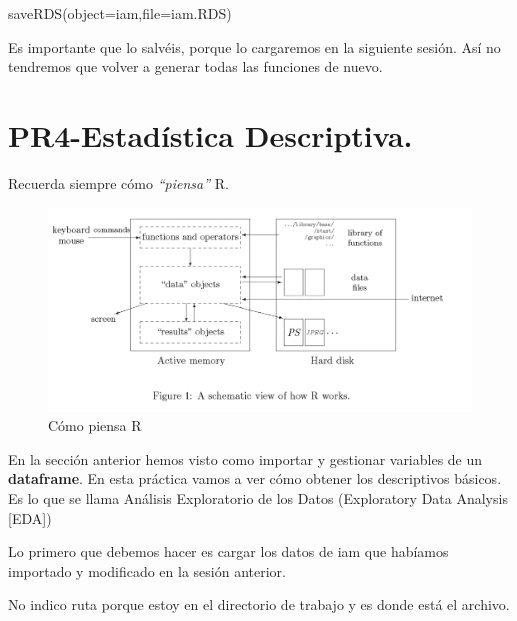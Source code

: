 \documentclass[
  letterpaper,
  DIV=11,
  numbers=noendperiod]{scrreprt}
\newenvironment{Shaded}{\begin{snugshade}}{\end{snugshade}}
\newcommand{\AttributeTok}[1]{\textcolor[rgb]{0.40,0.45,0.13}{#1}}
\newcommand{\FunctionTok}[1]{\textcolor[rgb]{0.28,0.35,0.67}{#1}}
\newcommand{\NormalTok}[1]{\textcolor[rgb]{0.00,0.23,0.31}{#1}}
\newcommand{\StringTok}[1]{\textcolor[rgb]{0.13,0.47,0.30}{#1}}
\begin{document}
\begin{Shaded}
\begin{Highlighting}[]
\FunctionTok{saveRDS}\NormalTok{(}\AttributeTok{object=}\NormalTok{iam,}\AttributeTok{file=}\StringTok{\textquotesingle{}iam.RDS\textquotesingle{}}\NormalTok{)}
\end{Highlighting}
\end{Shaded}

Es importante que lo salvéis, porque lo cargaremos en la siguiente
sesión. Así no tendremos que volver a generar todas las funciones de
nuevo.


\hypertarget{pr4-estaduxedstica-descriptiva.}{%
\chapter{PR4-Estadística
Descriptiva.}\label{pr4-estaduxedstica-descriptiva.}}

Recuerda siempre cómo \emph{``piensa''} R.

\begin{figure}

{\centering \includegraphics{./pics/como_piensa_R.png}

}

\caption{Cómo piensa R}

\end{figure}

En la sección anterior hemos visto como importar y gestionar variables
de un \textbf{dataframe}. En esta práctica vamos a ver cómo obtener los
descriptivos básicos. Es lo que se llama Análisis Exploratorio de los
Datos (Exploratory Data Analysis {[}EDA{]})

Lo primero que debemos hacer es cargar los datos de iam que habíamos
importado y modificado en la sesión anterior.

No indico ruta porque estoy en el directorio de trabajo y es donde está
el archivo.
\end{document}
